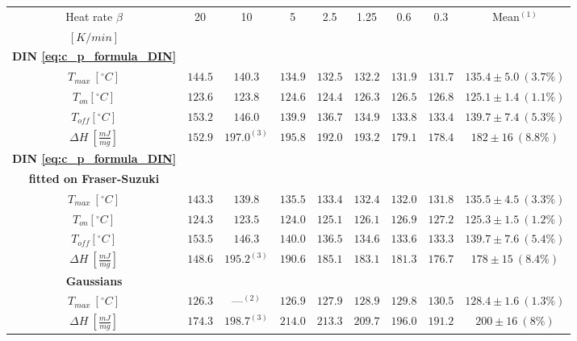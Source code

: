 \documentclass{scrartcl}[12pt, halfparskip]
\numberwithin{equation}{section}
\numberwithin{figure}{section}
\numberwithin{table}{section}
\begin{document}
\begin{table}[H]
	\hspace{-1.7cm}
	\begin{tabular}{| c | c | c | c | c | c | c | c || c |} \hline
		Heat rate $\beta$ & 20 & 10 & 5 & 2.5 & 1.25 & 0.6 & 0.3 & Mean$^{(1)}$ \\
		$[K/min]$ & & & & & & & & \\ \hline
		\textbf{DIN \cref{eq:c_p_formula_DIN}} & & & & & & & & \\[0.7ex]
		$T_{max} \ [^{\circ}C]$ & $144.5$ & $140.3$ & $134.9$ & $132.5$ & $132.2$ & $131.9$ & $131.7$ & $135.4 \pm 5.0 \ (3.7\%)$ \\[0.7ex]
		$T_{on} [^{\circ} C]$ & $123.6$ & $123.8$ & $124.6$ & $124.4$ & $126.3$ & $126.5$ & $126.8$ & $125.1 \pm 1.4 \ (1.1\%)$ \\[0.7ex]
		$T_{off} [^{\circ} C]$ & $153.2$ & $146.0$ & $139.9$ & $136.7$ & $134.9$ & $133.8$ & $133.4$ & $139.7 \pm 7.4 \ (5.3\%)$ \\[0.7ex]
		$\Delta H \ [\frac{mJ}{mg}]$ & $152.9$ & $197.0^{(3)}$ & $195.8$ & $192.0$ & $193.2$ & $179.1$ & $178.4$ & $182 \pm 16 \ (8.8\%)$ \\ \hline

		\textbf{DIN \cref{eq:c_p_formula_DIN}} & & & & & & & & \\
		\textbf{fitted on Fraser-Suzuki} & & & & & & & & \\
		$T_{max} \ [^{\circ}C]$ & $143.3$ & $139.8$ & $135.5$ & $133.4$ & $132.4$ & $132.0$ & $131.8$ & $135.5 \pm 4.5 \ (3.3\%)$ \\[0.7ex]
		$T_{on} [^{\circ} C]$ & $124.3$ & $123.5$ & $124.0$ & $125.1$ & $126.1$ & $126.9$ & $127.2$ & $125.3 \pm 1.5 \ (1.2\%)$ \\[0.7ex]
		$T_{off} [^{\circ} C]$ & $153.5$ & $146.3$ & $140.0$ & $136.5$ & $134.6$ & $133.6$ & $133.3$ & $139.7 \pm 7.6 \ (5.4\%)$ \\[0.7ex]
		$\Delta H \ [\frac{mJ}{mg}]$ & $148.6$ & $195.2^{(3)}$ & $190.6$ & $185.1$ & $183.1$ & $181.3$ & $176.7$ & $178 \pm 15 \ (8.4\%)$ \\ \hline
		
		\textbf{Gaussians} & & & & & & & & \\[0.7ex]
		$T_{max} \ [^{\circ}C]$ & $126.3$ & ---$^{(2)}$ & $126.9$ & $127.9$ & $128.9$ & $129.8$ & $130.5$ & $128.4 \pm 1.6 \ (1.3\%)$ \\[0.7ex]
		$\Delta H \ [\frac{mJ}{mg}]$ & $174.3$ & $198.7^{(3)}$ & $214.0$ & $213.3$ & $209.7$ & $196.0$ & $191.2$ & $200 \pm 16 \ (8\%)$ \\ \hline
		

\end{tabular}
\end{table}
\end{document}
